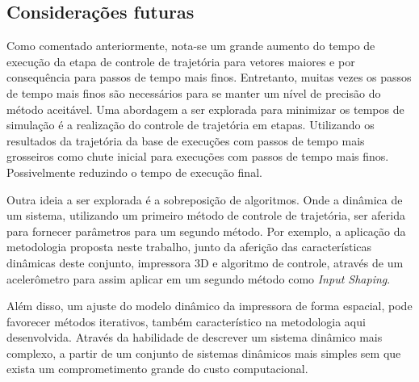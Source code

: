 \subsection{Considerações futuras}
Como comentado anteriormente, nota-se um grande aumento do tempo de execução da etapa de controle de trajetória para vetores maiores e por consequência para passos de tempo mais finos. Entretanto, muitas vezes os passos de tempo mais finos são necessários para se manter um nível de precisão do método aceitável. Uma abordagem a ser explorada para minimizar os tempos de simulação é a realização do controle de trajetória em etapas. Utilizando os resultados da trajetória da base de execuções com passos de tempo mais grosseiros como chute inicial para execuções com passos de tempo mais finos. Possivelmente reduzindo o tempo de execução final.

Outra ideia a ser explorada é a sobreposição de algoritmos. Onde
a dinâmica de um sistema, utilizando um primeiro método de controle de trajetória, ser aferida para fornecer parâmetros para um segundo método. Por exemplo, a aplicação da metodologia proposta neste trabalho, junto da aferição das características dinâmicas deste conjunto, impressora 3D e algoritmo de controle, através de um acelerômetro para assim aplicar em um segundo método como \textit{Input Shaping}.

Além disso, um ajuste do modelo dinâmico da impressora de forma espacial, pode favorecer métodos iterativos, também característico na metodologia aqui desenvolvida. Através da habilidade de descrever um sistema dinâmico mais complexo, a partir de um conjunto de sistemas dinâmicos mais simples sem que exista um comprometimento grande do custo computacional.


